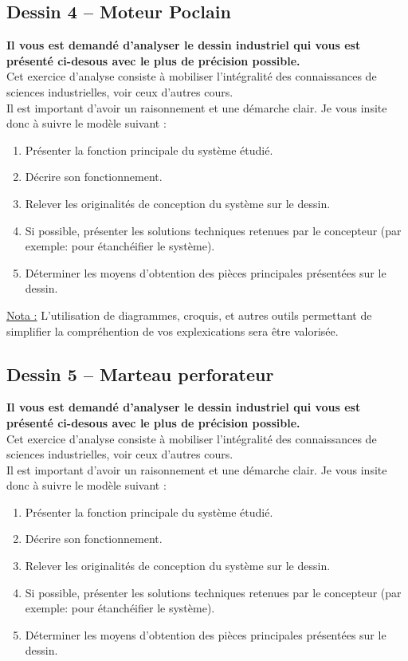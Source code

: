 

\subsection{Dessin 4 -- Moteur Poclain}
\textbf{Il vous est demandé d'analyser le dessin industriel qui vous est présenté ci-desous avec le plus de précision possible.}\\
Cet exercice d'analyse consiste à mobiliser l'intégralité des connaissances de sciences industrielles, voir ceux d'autres cours.\\
Il est important d'avoir un raisonnement et une démarche clair. Je vous insite donc à suivre le modèle suivant :

\begin{enumerate}
\item Présenter la fonction principale du système étudié.
\item Décrire son fonctionnement.
\item Relever les originalités de conception du système sur le dessin.
\item Si possible, présenter les solutions techniques retenues par le concepteur (par exemple: pour étanchéifier le système).
\item Déterminer les moyens d'obtention des pièces principales présentées sur le dessin.
\end{enumerate}

\underline{Nota :} L'utilisation de diagrammes, croquis, et autres outils permettant de simplifier la compréhention de vos explexications sera être valorisée.



\subsection{Dessin 5 -- Marteau perforateur}
\textbf{Il vous est demandé d'analyser le dessin industriel qui vous est présenté ci-desous avec le plus de précision possible.}\\
Cet exercice d'analyse consiste à mobiliser l'intégralité des connaissances de sciences industrielles, voir ceux d'autres cours.\\
Il est important d'avoir un raisonnement et une démarche clair. Je vous insite donc à suivre le modèle suivant :

\begin{enumerate}
\item Présenter la fonction principale du système étudié.
\item Décrire son fonctionnement.
\item Relever les originalités de conception du système sur le dessin.
\item Si possible, présenter les solutions techniques retenues par le concepteur (par exemple: pour étanchéifier le système).
\item Déterminer les moyens d'obtention des pièces principales présentées sur le dessin.
\end{enumerate}


